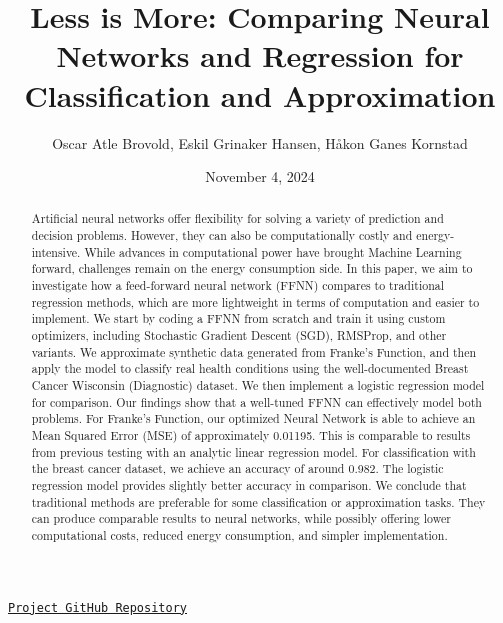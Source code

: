 \documentclass{article}
\title{Less is More: Comparing Neural Networks and Regression for Classification and Approximation}
\author{Oscar Atle Brovold, Eskil Grinaker Hansen, Håkon Ganes Kornstad}
\date{November 4, 2024}
\begin{document}
\maketitle
\begin{center}
    \href{https://github.com/EOH-ML/FYS-STK3155-Projects/tree/main/project2}{\texttt{Project GitHub Repository}}
\end{center}



\begin{abstract}
\noindent Artificial neural networks offer flexibility for solving a variety of prediction and decision problems. However, they can also be computationally costly and energy-intensive. While advances in computational power have brought Machine Learning forward, challenges remain on the energy consumption side. In this paper, we aim to investigate how a feed-forward neural network (FFNN) compares to traditional regression methods, which are more lightweight in terms of computation and easier to implement. We start by coding a FFNN from scratch and train it using custom optimizers, including Stochastic Gradient Descent (SGD), RMSProp, and other variants. We approximate synthetic data generated from Franke's Function, and then apply the model to classify real health conditions using the well-documented Breast Cancer Wisconsin (Diagnostic) dataset. We then implement a logistic regression model for comparison. Our findings show that a well-tuned FFNN can effectively model both problems. For Franke's Function, our optimized Neural Network is able to achieve an Mean Squared Error (MSE) of approximately 0.01195. This is comparable to results from previous testing with an analytic linear regression model. For classification with the breast cancer dataset,  we achieve an accuracy of around 0.982. The logistic regression model provides slightly better accuracy in comparison. We conclude that traditional methods are preferable for some classification or approximation tasks. They can produce comparable results to neural networks, while possibly offering lower computational costs, reduced energy consumption, and simpler implementation.
\end{abstract}
\end{document}
